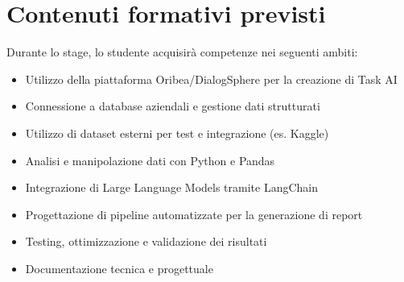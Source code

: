 \section*{Contenuti formativi previsti}
Durante lo stage, lo studente acquisirà competenze nei seguenti ambiti:
\begin{itemize}
 \item Utilizzo della piattaforma Oribea/DialogSphere per la creazione di Task AI
 \item Connessione a database aziendali e gestione dati strutturati
 \item Utilizzo di dataset esterni per test e integrazione (es. Kaggle)
 \item Analisi e manipolazione dati con Python e Pandas
 \item Integrazione di Large Language Models tramite LangChain
 \item Progettazione di pipeline automatizzate per la generazione di report
 \item Testing, ottimizzazione e validazione dei risultati
 \item Documentazione tecnica e progettuale
\end{itemize}

\newpage